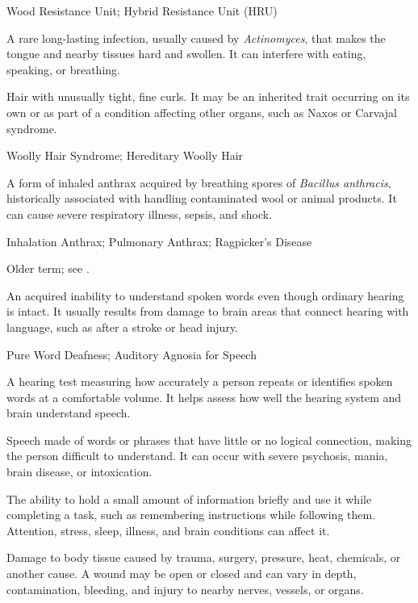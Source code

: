 \synonyms
Wood Resistance Unit; Hybrid Resistance Unit (HRU)

 A rare long-lasting infection, usually caused by \textit{Actinomyces}, that makes the tongue and nearby tissues hard and swollen. It can interfere with eating, speaking, or breathing.

 Hair with unusually tight, fine curls. It may be an inherited trait occurring on its own or as part of a condition affecting other organs, such as Naxos or Carvajal syndrome.

\synonyms
Woolly Hair Syndrome; Hereditary Woolly Hair

 A form of inhaled anthrax acquired by breathing spores of \textit{Bacillus anthracis}, historically associated with handling contaminated wool or animal products. It can cause severe respiratory illness, sepsis, and shock.

\synonyms
Inhalation Anthrax; Pulmonary Anthrax; Ragpicker's Disease

 Older term; see .

 An acquired inability to understand spoken words even though ordinary hearing is intact. It usually results from damage to brain areas that connect hearing with language, such as after a stroke or head injury.

\synonyms
Pure Word Deafness; Auditory Agnosia for Speech

 A hearing test measuring how accurately a person repeats or identifies spoken words at a comfortable volume. It helps assess how well the hearing system and brain understand speech.

 Speech made of words or phrases that have little or no logical connection, making the person difficult to understand. It can occur with severe psychosis, mania, brain disease, or intoxication.

 The ability to hold a small amount of information briefly and use it while completing a task, such as remembering instructions while following them. Attention, stress, sleep, illness, and brain conditions can affect it.

 Damage to body tissue caused by trauma, surgery, pressure, heat, chemicals, or another cause. A wound may be open or closed and can vary in depth, contamination, bleeding, and injury to nearby nerves, vessels, or organs.

